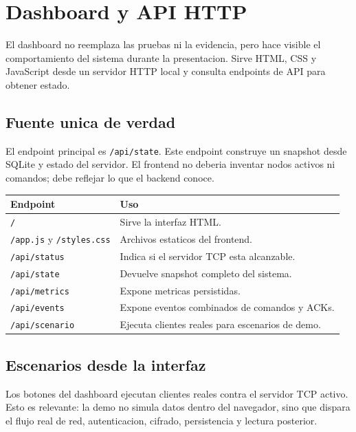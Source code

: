 \documentclass[11pt,letterpaper]{article}
\begin{document}
\newpage
\section{Dashboard y API HTTP}

El dashboard no reemplaza las pruebas ni la evidencia, pero hace visible el
comportamiento del sistema durante la presentacion. Sirve HTML, CSS y JavaScript
desde un servidor HTTP local y consulta endpoints de API para obtener estado.

\subsection{Fuente unica de verdad}

El endpoint principal es \texttt{/api/state}. Este endpoint construye un snapshot
desde SQLite y estado del servidor. El frontend no deberia inventar nodos activos
ni comandos; debe reflejar lo que el backend conoce.

\begin{longtable}{|p{}|p{}|}
\hline
\textbf{Endpoint} & \textbf{Uso} \\
\hline
\texttt{/} & Sirve la interfaz HTML. \\
\hline
\texttt{/app.js} y \texttt{/styles.css} & Archivos estaticos del frontend. \\
\hline
\texttt{/api/status} & Indica si el servidor TCP esta alcanzable. \\
\hline
\texttt{/api/state} & Devuelve snapshot completo del sistema. \\
\hline
\texttt{/api/metrics} & Expone metricas persistidas. \\
\hline
\texttt{/api/events} & Expone eventos combinados de comandos y ACKs. \\
\hline
\texttt{/api/scenario} & Ejecuta clientes reales para escenarios de demo. \\
\hline
\end{longtable}

\subsection{Escenarios desde la interfaz}

Los botones del dashboard ejecutan clientes reales contra el servidor TCP activo.
Esto es relevante: la demo no simula datos dentro del navegador, sino que dispara
el flujo real de red, autenticacion, cifrado, persistencia y lectura posterior.
\end{document}
